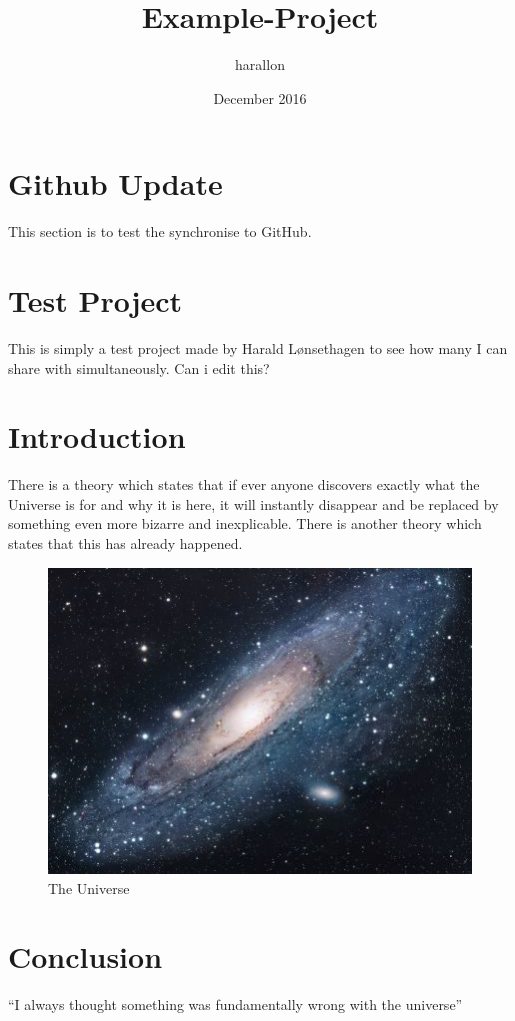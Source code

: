 \documentclass{article}
\title{Example-Project}
\author{harallon }
\date{December 2016}
\begin{document}
\maketitle

\section{Github Update}
This section is to test the synchronise to GitHub. 


\section{Test Project}
This is simply a test project made by Harald Lønsethagen to see how many I can share with simultaneously.
Can i edit this?

\section{Introduction}
There is a theory which states that if ever anyone discovers exactly what the Universe is for and why it is here, it will instantly disappear and be replaced by something even more bizarre and inexplicable.
There is another theory which states that this has already happened.

\begin{figure}[h!]
\centering
\includegraphics[scale=1.7]{universe.jpg}
\caption{The Universe}
\label{fig:univerise}
\end{figure}

\section{Conclusion}
``I always thought something was fundamentally wrong with the universe'' \citep{adams1995hitchhiker}



\end{document}
